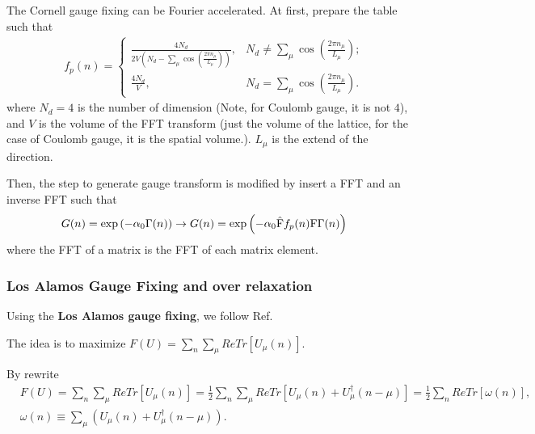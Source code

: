 The Cornell gauge fixing can be Fourier accelerated. At first, prepare the table such that
\begin{equation}
\begin{split}
&f_p(n)=\left\{\begin{array}{cc} \frac{4N_d}{2V\left(N_d-\sum _{\mu}\cos \left(\frac{2\pi n_{\mu}}{L_{\mu}}\right)\right)}, & N_d\neq \sum _{\mu}\cos \left(\frac{2\pi n_{\mu}}{L_{\mu}}\right); \\ \frac{4N_d}{V}, & N_d=\sum _{\mu}\cos \left(\frac{2\pi n_{\mu}}{L_{\mu}}\right). \end{array}\right.
\end{split}
\end{equation}
where $N_d=4$ is the number of dimension (Note, for Coulomb gauge, it is not $4$), and $V$ is the volume of the FFT transform (just the volume of the lattice, for the case of Coulomb gauge, it is the spatial volume.). $L_{\mu}$ is the extend of the direction.

Then, the step to generate gauge transform is modified by insert a FFT and an inverse FFT such that
\begin{equation}
\begin{split}
&G(n)=\exp \left(-\alpha _0\Gamma (n)\right)\to G(n)=\exp \left(-\alpha _0  \hat{\textmd{F}} f_p(n)\textmd{F} \Gamma (n)\right)
\end{split}
\end{equation}
where the FFT of a matrix is the FFT of each matrix element.


\subsubsection{\label{sec:LosAlamos}Los Alamos Gauge Fixing and over relaxation}

Using the \textbf{Los Alamos gauge fixing}, we follow Ref.~\cite{LosAlamosGaugeFixing}

The idea is to maximize $F(U)=\sum _n\sum _{\mu} ReTr[U_{\mu}(n)]$.

By rewrite
\begin{equation}
\begin{split}
&F(U)=\sum _n\sum _{\mu} ReTr[U_{\mu}(n)]=\frac{1}{2}\sum _n\sum _{\mu} ReTr[U_{\mu}(n)+U_{\mu}^{\dagger}(n-\mu)]=\frac{1}{2}\sum _n ReTr[\omega (n)],\\
&\omega (n)\equiv \sum _{\mu} \left(U_{\mu}(n)+U_{\mu}^{\dagger}(n-\mu)\right).
\end{split}
\end{equation}


